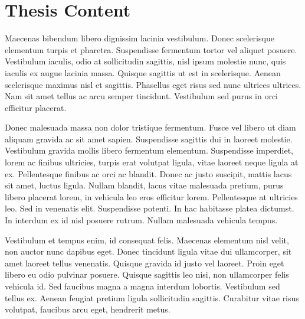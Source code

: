 \chapter{Thesis Content}

Maecenas bibendum libero dignissim lacinia vestibulum. Donec scelerisque elementum turpis et pharetra. Suspendisse fermentum tortor vel aliquet posuere. Vestibulum iaculis, odio at sollicitudin sagittis, nisl ipsum molestie nunc, quis iaculis ex augue lacinia massa. Quisque sagittis ut est in scelerisque. Aenean scelerisque maximus nisl et sagittis. Phasellus eget risus sed nunc ultrices ultrices. Nam sit amet tellus ac arcu semper tincidunt. Vestibulum sed purus in orci efficitur placerat.

Donec malesuada massa non dolor tristique fermentum. Fusce vel libero ut diam aliquam gravida ac sit amet sapien. Suspendisse sagittis dui in laoreet molestie. Vestibulum gravida mollis libero fermentum elementum. Suspendisse imperdiet, lorem ac finibus ultricies, turpis erat volutpat ligula, vitae laoreet neque ligula at ex. Pellentesque finibus ac orci ac blandit. Donec ac justo suscipit, mattis lacus sit amet, luctus ligula. Nullam blandit, lacus vitae malesuada pretium, purus libero placerat lorem, in vehicula leo eros efficitur lorem. Pellentesque at ultricies leo. Sed in venenatis elit. Suspendisse potenti. In hac habitasse platea dictumst. In interdum ex id nisl posuere rutrum. Nullam malesuada vehicula tempus.

Vestibulum et tempus enim, id consequat felis. Maecenas elementum nisl velit, non auctor nunc dapibus eget. Donec tincidunt ligula vitae dui ullamcorper, sit amet laoreet tellus venenatis. Quisque gravida id justo vel laoreet. Proin eget libero eu odio pulvinar posuere. Quisque sagittis leo nisi, non ullamcorper felis vehicula id. Sed faucibus magna a magna interdum lobortis. Vestibulum sed tellus ex. Aenean feugiat pretium ligula sollicitudin sagittis. Curabitur vitae risus volutpat, faucibus arcu eget, hendrerit metus.